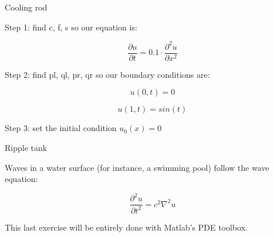 \documentclass{beamer}
\begin{document}
  \begin{frame}{Cooling rod}
  
  	Step 1: find c, f, s so our equation is:
    
    \begin{displaymath}
  		\frac{\partial u}{\partial t} = 0.1 \cdot \frac{\partial^2 u}{\partial x^2} 
  	\end{displaymath}
    
    \pause
    
    Step 2: find pl, ql, pr, qr so our boundary conditions are:
    
    \begin{displaymath}
    	u(0, t) =  0
  	\end{displaymath}
    
    \begin{displaymath}
    	u(1, t) =  sin(t)
  	\end{displaymath}
    
    \pause
    
    Step 3: set the initial condition $u_0(x) = 0$
  	
  \end{frame}
  
  \begin{frame}{Ripple tank}
  
  Waves in a water surface (for instance, a swimming pool) follow the wave equation:
  
    \begin{displaymath}
    	\frac{\partial^2 u}{\partial t^2} = c^2 \nabla^2 u
  	\end{displaymath}
    
  This last exercise will be entirely done with Matlab's PDE toolbox.
  
  \end{frame}
\end{document}

